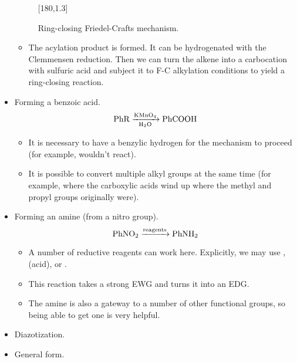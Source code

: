 \documentclass[../notes.tex]{subfiles}
\begin{document}
\begin{itemize}
\begin{figure}[h!]
            \arrow{->[][-\ce{H2SO4}]}[180,1.3]
        \schemestop
        \caption{Ring-closing Friedel-Crafts mechanism.}
        \label{fig:ringClosingFC}
    \end{figure}
    \begin{itemize}
        \item The acylation product is formed. It can be hydrogenated with the Clemmensen reduction. Then we can turn the alkene into a carbocation with sulfuric acid and subject it to F-C alkylation conditions to yield a ring-closing reaction.
    \end{itemize}
    \item Forming a benzoic acid.
    \begin{equation*}
        \ce{PhR ->[KMnO4][H2O] PhCOOH}
    \end{equation*}
    \begin{itemize}
        \item It is necessary to have a benzylic hydrogen for the mechanism to proceed (for example,  wouldn't react).
        \item It is possible to convert multiple alkyl groups at the same time (for example,  where the carboxylic acids wind up where the methyl and propyl groups originally were). 
    \end{itemize}
    \item Forming an amine (from a nitro group).
    \begin{equation*}
        \ce{PhNO2 ->[reagents] PhNH2}
    \end{equation*}
    \begin{itemize}
        \item A number of reductive reagents can work here. Explicitly, we may use ,  (acid), or .
        \item This reaction takes a strong EWG and turns it into an EDG.
        \item The amine is also a gateway to a number of other functional groups, so being able to get one is very helpful.
    \end{itemize}
    \item Diazotization.
    \item General form.

\end{itemize}
\end{document}

